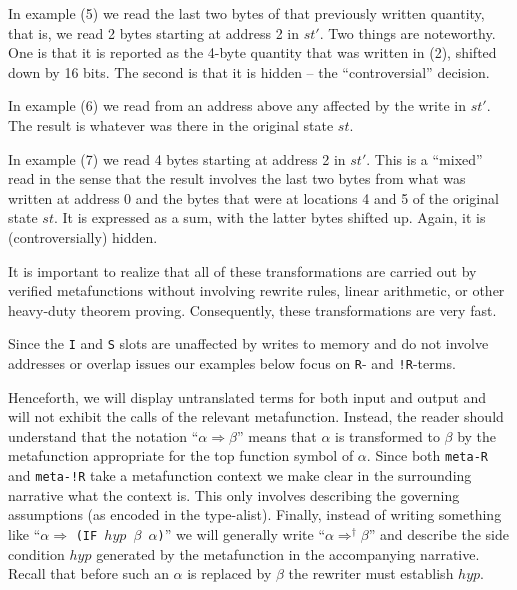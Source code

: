 \documentclass[submission,copyright,creativecommons]{eptcs}
\newcommand{\ptt}[1]{\tt{#1}}
\begin{document}
In example {\rm{(5)}} we read the last two bytes of that previously written
quantity, that is, we read 2 bytes starting at address 2 in $st'$.  Two things
are noteworthy.  One is that it is reported as the 4-byte quantity that was
written in {\rm{(2)}}, shifted down by 16 bits.  The second is that it is hidden -- the
``controversial'' decision.

In example {\rm{(6)}} we read from an address above any affected by the write in $st'$.
The result is whatever was there in the original state $st$.

In example {\rm{(7)}} we read 4 bytes starting at address 2 in $st'$.  This is a
``mixed'' read in the sense that the result involves the last two bytes from
what was written at address 0 and the bytes that were at locations 4 and 5 of
the original state $st$.  It is expressed as a sum, with the latter bytes
shifted up.  Again, it is (controversially) hidden.

It is important to realize that all of these transformations are carried out
by verified metafunctions without involving rewrite rules, linear arithmetic,
or other heavy-duty theorem proving.  Consequently, these transformations
are very fast.

Since the {\ptt{I}} and {\ptt{S}} slots are unaffected by writes to memory
and do not involve addresses or overlap issues our examples below focus on
{\ptt{R}}- and {\ptt{!R}}-terms.

Henceforth, we will display untranslated terms for both input and output and will not
exhibit the calls of the relevant metafunction.  Instead, the reader should
understand that the notation ``$\alpha \Longrightarrow \beta$''
means that $\alpha$ is transformed to $\beta$ by the metafunction appropriate
for the top function symbol of $\alpha$.  Since both {\ptt{meta-R}} and
{\ptt{meta-!R}} take a metafunction context we make clear in the surrounding
narrative what the context is.  This only involves describing the governing
assumptions (as encoded in the type-alist).  Finally, instead of writing
something like ``$\alpha \Longrightarrow$ {\ptt{(IF $hyp$ $\beta$
    $\alpha$)}}'' we will generally write ``$\alpha
\Longrightarrow^\dagger \beta$'' and describe the side condition
$hyp$ generated by the metafunction in the accompanying narrative.  Recall
that before such an $\alpha$ is replaced by $\beta$ the rewriter must
establish $hyp$.
\end{document}

